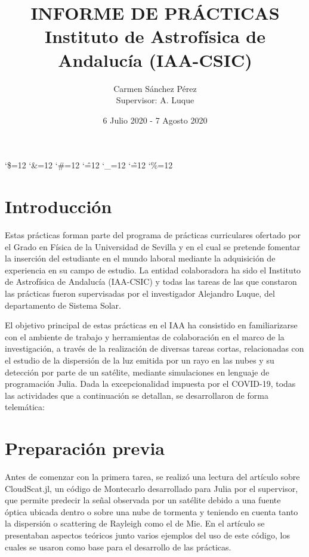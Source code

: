 \documentclass[10pt,letterpaper]{article}
\newenvironment{simplechar}{%
   \catcode`\$=12
   \catcode`\&=12
   \catcode`\#=12
   \catcode`\^=12
   \catcode`\_=12
   \catcode`\~=12
   \catcode`\%=12}{}
\begin{document}
\title{INFORME DE PRÁCTICAS\\ Instituto de Astrofísica de Andalucía (IAA-CSIC)}
\date{6 Julio 2020 - 7 Agosto 2020}
\author{Carmen Sánchez Pérez\\[0.5cm]{Supervisor: A. Luque}}
\maketitle
\begin{simplechar}
\section{Introducción}
Estas prácticas forman parte del programa de prácticas curriculares ofertado por el Grado en Física de la Universidad de Sevilla y en el cual se pretende fomentar la inserción del estudiante en el mundo laboral mediante la adquisición de experiencia en su campo de estudio. La entidad colaboradora ha sido el Instituto de Astrofísica de Andalucía (IAA-CSIC) y todas las tareas de las que constaron las prácticas fueron supervisadas por el investigador Alejandro Luque, del departamento de Sistema Solar.
 
\bigskip
El objetivo principal de estas prácticas en el IAA ha consistido en familiarizarse con el ambiente de trabajo y herramientas de colaboración en el marco de la investigación, a través de la realización de diversas tareas cortas, relacionadas con el estudio de la dispersión de la luz emitida por un rayo en las nubes y su detección por parte de un satélite, mediante simulaciones en lenguaje de programación Julia. Dada la excepcionalidad impuesta por el COVID-19, todas las actividades que a continuación se detallan, se desarrollaron de forma telemática:

\section{Preparación previa}
Antes de comenzar con la primera tarea, se realizó una lectura del artículo sobre CloudScat.jl, un código de Montecarlo desarrollado para Julia por el supervisor, que permite predecir la señal observada por un satélite debido a una fuente óptica ubicada dentro o sobre una nube de tormenta y teniendo en cuenta tanto la dispersión o scattering de Rayleigh como el de Mie. En el artículo se presentaban aspectos teóricos junto varios ejemplos del uso de este código, los cuales se usaron como base para el desarrollo de las prácticas.


\end{simplechar}
\end{document}
